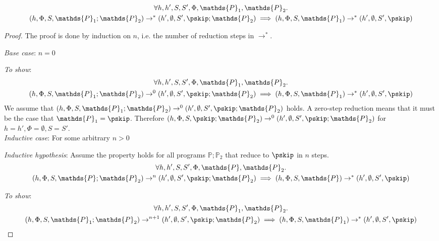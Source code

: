\begin{lem}
	\label{ref:2seq}
	\begin{gather*}
		\forall h, h', S, S', \Phi, \mathds{P}_1, \mathds{P}_2 \ldotp \\
		(h, \Phi, S, \mathds{P}_1; \mathds{P}_2) \rightarrow^* (h', \emptyset, S', \pskip; \mathds{P}_2)
		\implies
		(h, \Phi, S, \mathds{P}_1) \rightarrow^* (h', \emptyset, S', \pskip)
	\end{gather*}
	
	{\parindent0pt
	\begin{proof}
	The proof is done by induction on $n$, i.e. the number of reduction steps in $\rightarrow^*$.
	
	\indline
	\textit{Base case}: $n = 0$
	
	\textit{To show}:
	\begin{gather*}
		\forall h, h', S, S', \Phi, \mathds{P}_1, \mathds{P}_2 \ldotp \\
		(h, \Phi, S, \mathds{P}_1; \mathds{P}_2) \rightarrow^0 (h', \emptyset, S', \pskip; \mathds{P}_2)
		\implies
		(h, \Phi, S, \mathds{P}_1) \rightarrow^* (h', \emptyset, S', \pskip)
	\end{gather*}
	We assume that $(h, \Phi, S, \mathds{P}_1; \mathds{P}_2) \rightarrow^0 (h', \emptyset, S', \pskip; \mathds{P}_2)$ holds. A zero-step reduction means that it must be the case that $\mathds{P}_1 = \pskip$. Therefore $(h, \Phi, S, \pskip; \mathds{P}_2) \rightarrow^0 (h', \emptyset, S', \pskip; \mathds{P}_2)$ for $h = h', \Phi = \emptyset, S = S'$. \\
	\indline
	\textit{Inductive case}: For some arbitrary $n > 0$
	
	\textit{Inductive hypothesis}: Assume the property holds for all programs $\mathds{P}; \mathds{P}_2$ that reduce to $\pskip$ in $n$ steps.
	\begin{gather*}
		\forall h, h', S, S', \Phi, \mathds{P}, \mathds{P}_2 \ldotp \\ 
		(h, \Phi, S, \mathds{P}; \mathds{P}_2) \rightarrow^n (h', \emptyset, S', \pskip; \mathds{P}_2)
		\implies
		(h, \Phi, S, \mathds{P}) \rightarrow^* (h', \emptyset, S', \pskip)
	\end{gather*}
	
	\textit{To show}:
	\begin{gather*}
		\forall h, h', S, S', \Phi, \mathds{P}_1, \mathds{P}_2 \ldotp \\
		(h, \Phi, S, \mathds{P}_1; \mathds{P}_2) \rightarrow^{n+1} (h', \emptyset, S', \pskip; \mathds{P}_2)
		\implies
		(h, \Phi, S, \mathds{P}_1) \rightarrow^* (h', \emptyset, S', \pskip)
	\end{gather*}
	

\end{proof}}
\end{lem}
